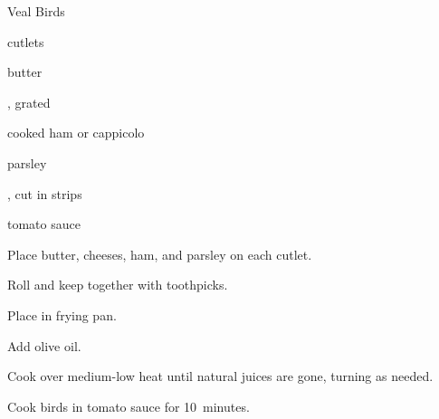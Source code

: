 \begin{recipe}{Veal Birds}{}{}

\begin{ingredients}
\item {} cutlets
\item butter
\item {}, grated
\item cooked ham or cappicolo
\item parsley
\item {}, cut in strips
\item tomato sauce
\end{ingredients}

\begin{directions}
\item Place butter, cheeses, ham, and parsley on each cutlet.
\item Roll and keep together with toothpicks.
\item Place in frying pan.
\item Add olive oil.
\item Cook over medium-low heat until natural juices are gone, turning as needed.
\item Cook birds in tomato sauce for 10~minutes.
\end{directions}

\end{recipe}
